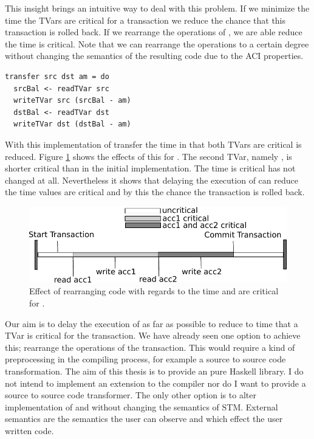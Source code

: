 This insight brings an intuitive way to deal with this problem. If we minimize the time the TVars are critical for
a transaction we reduce the chance that this transaction is rolled back. 
If we rearrange the operations of , we are able reduce the time  is critical. Note that we 
can rearrange the operations to a certain degree without changing the semantics of the resulting code due to the ACI 
properties. 
\begin{lstlisting}
transfer src dst am = do 
  srcBal <- readTVar src
  writeTVar src (srcBal - am)
  dstBal <- readTVar dst
  writeTVar dst (dstBal - am)
\end{lstlisting}
With this implementation of transfer the time in that both TVars are critical is reduced. Figure \ref{fig:criticalValue2}
shows the effects of this for . The second TVar, namely , is shorter critical than in the 
initial implementation. The time  is critical has not changed at all. Nevertheless it shows that delaying the
execution of  can reduce the time values are critical and by this the chance the transaction is rolled back.
\begin{figure}
\centering
\includegraphics{Figures/CriticalValue2}
\decoRule
\caption[Critical Value II]{Effect of rearranging code with regards to the time  and  are critical for .}
\label{fig:criticalValue2}
\end{figure}
Our aim is to delay the execution of  as far as possible to reduce to time that
a TVar is critical for the transaction. We have already seen one option to achieve this; rearrange the 
operations of the transaction. This would require a kind of preprocessing in the compiling process, for 
example a source to source code transformation. The aim of this thesis is to provide an pure Haskell
library. I do not intend to implement an extension to the compiler nor do I 
want to provide a source to source code transformer. The only other option is to alter implementation
of  and  without changing the  semantics of STM. 
External semantics are the semantics the user can observe and which effect the user written code.

